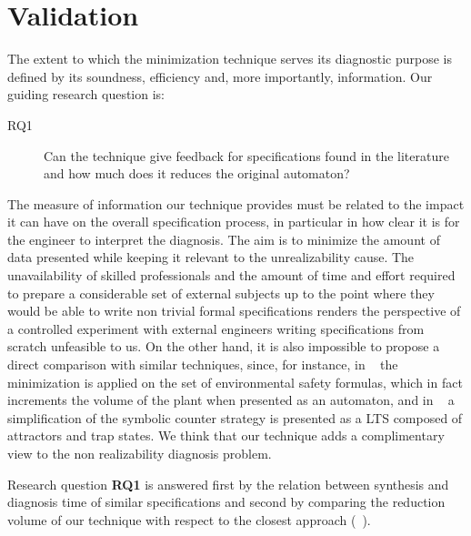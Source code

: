 \section{Validation}\label{sec:validation}
The extent to which the minimization technique serves its diagnostic purpose is defined by its soundness, efficiency and, more importantly, information. 
Our guiding research question is:
\begin{description}
	\item[RQ1] Can the technique give feedback for specifications found in the literature and how much does it reduces the original automaton?
\end{description}


The measure of information our technique provides must be related to the impact it can have on the overall specification process, in particular in how clear it is for the engineer  to interpret the diagnosis. The aim is to minimize the amount of data presented while keeping it relevant to the unrealizability cause. The unavailability of skilled professionals and the amount of time and effort required to prepare a considerable set of external subjects up to the point where they would be able to write non trivial formal specifications renders the perspective of a controlled experiment with external engineers writing specifications from scratch unfeasible to us. On the other hand, it is also impossible to propose a direct comparison with similar techniques, since, for instance, in ~\cite{DBLP:conf/hvc/KonighoferHB10} the minimization is applied on the set of environmental safety formulas, which in fact increments the volume of the plant when presented as an automaton, and in ~\cite{DBLP:conf/sigsoft/KuventMR17} a simplification of the symbolic counter strategy is presented as a LTS composed of attractors and trap states. We think that our technique adds a complimentary view to the non realizability diagnosis problem.

Research question \textbf{RQ1} is answered first by the relation between synthesis and diagnosis time of similar specifications and second by comparing the reduction volume of our technique with respect to the closest approach (~\cite{DBLP:conf/hvc/KonighoferHB10}). 

